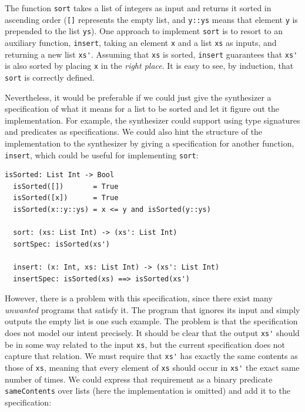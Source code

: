 \noindent
The function \lstinline{sort} takes a list of integers as input and returns
it sorted in ascending order (\lstinline{[]} represents the empty list, and
\lstinline{y::ys} means that element \lstinline{y} is prepended to the list
\lstinline{ys}).
One approach to implement \lstinline{sort} is to resort to an auxiliary
function, \lstinline{insert}, taking an element \lstinline{x} and a list
\lstinline{xs} as inputs, and returning a new list \lstinline{xs'}.
Assuming that \lstinline{xs} is sorted, \lstinline{insert} guarantees that
\lstinline{xs'} is also sorted by placing \lstinline{x} in the \textit{right
  place}.
It is easy to see, by induction, that \lstinline{sort} is correctly defined.

Nevertheless, it would be preferable if we could just give the synthesizer a
specification of what it means for a list to be sorted and let it figure out the
implementation. For example, the synthesizer could support using type signatures
and predicates as specifications. We could also hint the structure of the
implementation to the synthesizer by giving a specification for another
function, \lstinline{insert}, which could be useful for implementing
\lstinline{sort}:

\begin{lstlisting}[xleftmargin=.2\textwidth]
  isSorted: List Int -> Bool
  isSorted([])       = True
  isSorted([x])      = True
  isSorted(x::y::ys) = x <= y and isSorted(y::ys)

  sort: (xs: List Int) -> (xs': List Int)
  sortSpec: isSorted(xs')

  insert: (x: Int, xs: List Int) -> (xs': List Int)
  insertSpec: isSorted(xs) ==> isSorted(xs')
\end{lstlisting}

\noindent
However, there is a problem with this specification, since there exist many
\textit{unwanted} programs that satisfy it.
The program that ignores its input and simply outputs the empty list is one such
example.
The problem is that the specification does not model our intent precisely.
It should be clear that the output \lstinline{xs'} should be in some way related
to the input \lstinline{xs}, but the current specification does not capture that
relation.
We must require that \lstinline{xs'} has exactly the same contents as those of
\lstinline{xs}, meaning that every element of \lstinline{xs} should occur in
\lstinline{xs'} the exact same number of times.
We could express that requirement as a binary predicate \lstinline{sameContents}
over lists (here the implementation is omitted) and add it to the specification:

